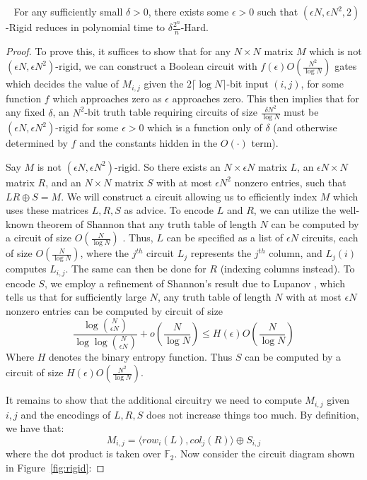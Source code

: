\begin{theorem}~\label{thm:rigidity-circuit}
For any sufficiently small $\delta > 0$, there exists some $\epsilon > 0$ such that {\sc $(\epsilon N, \epsilon N^2, 2)$-Rigid} reduces in polynomial time to {\sc $\delta \frac{2^n}{n}$-Hard}.
\end{theorem}

\begin{proof}
To prove this, it suffices to show that for any $N \times N$ matrix $M$ which is not $(\epsilon N, \epsilon N^2)$-rigid, we can construct a Boolean circuit with $f(\epsilon)O(\frac{N^2}{\log N})$ gates which decides the value of $M_{i,j}$ given the $2\lceil \log N \rceil$-bit input $(i,j)$, for some function $f$ which approaches zero as $\epsilon$ approaches zero. This then implies that for any fixed $\delta$, an $N^2$-bit truth table requiring circuits of size $\frac{\delta N^2}{\log N}$ must be $(\epsilon N, \epsilon N^2)$-rigid  for some $\epsilon > 0$ which is a function only of $\delta$ (and otherwise determined by $f$ and the constants hidden in the $O(\cdot)$ term).

Say $M$ is not $(\epsilon N, \epsilon N^2)$-rigid. So there exists an $N \times \epsilon N$ matrix $L$, an $\epsilon N \times N$ matrix $R$, and an $N \times N$ matrix $S$ with at most $\epsilon N^2$ nonzero entries, such that $LR \oplus S = M$. We will construct a circuit allowing us to efficiently index $M$ which uses these matrices $L, R, S$ as advice. To encode $L$ and $R$, we can utilize the well-known theorem of Shannon that any truth table of length $N$ can be computed by a circuit of size $O(\frac{N}{\log N})$ \cite{Shannon}. Thus, $L$ can be specified as a list of $\epsilon N$ circuits, each of size $O(\frac{N}{\log N})$, where the $j^{th}$ circuit $L_j$ represents the $j^{th}$ column, and $L_j(i)$ computes $L_{i,j}$. The same can then be done for $R$ (indexing columns instead). To encode $S$, we employ a refinement of Shannon's result due to Lupanov \cite{Coin-Problem}, which tells us that for sufficiently large $N$, any truth table of length $N$ with at most $\epsilon N$ nonzero entries can be computed by circuit of size
\[
\frac{\log\binom{N}{\epsilon N}}{\log \log \binom{N}{\epsilon N}} + o\left(\frac{N}{\log N}\right) \leq H(\epsilon) O(\frac{N}{\log N})
\]
Where $H$ denotes the binary entropy function. Thus $S$ can be computed by a circuit of size $H(\epsilon) O(\frac{N^2}{\log N})$.

It remains to show that the additional circuitry we need to compute $M_{i,j}$ given $i, j$ and the encodings of $L,R,S$ does not increase things too much. By definition, we have that: 
\[M_{i,j} = \langle row_i(L), col_j(R) \rangle \oplus S_{i,j}\]
where the dot product is taken over $\mathbb{F}_2$. Now consider the circuit diagram shown in Figure~\ref{fig:rigid}:


\end{proof}
